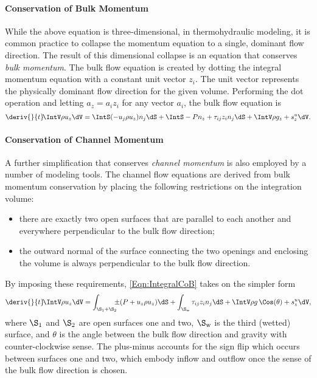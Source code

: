 \paragraph{Conservation of Bulk Momentum}
While the above equation is three-dimensional, in thermohydraulic modeling, it is common practice to collapse the momentum equation to a single, dominant flow direction.
The result of this dimensional collapse is an equation that conserves \textit{bulk momentum}.
The bulk flow equation is created by dotting the integral momentum equation with a constant unit vector $z_i$.
The unit vector represents the physically dominant flow direction for the given volume.
Performing the dot operation and letting $a_z = a_i z_i$ for any vector $a_i$, the bulk flow equation is 
\begin{equation}
    \deriv{}{t}\! \IntV \rho u_z \dV = \IntS (-u_j \rho u_z) n_j \dS + \IntS - P n_z + \tau_{ij} z_i n_j \dS + \IntV \rho g_z + s^u_z \dV.
    \label{Eqn:IntegralCoB}
\end{equation}

\paragraph{Conservation of Channel Momentum}
A further simplification that conserves \textit{channel momentum} is also employed by a number of modeling tools.
The channel flow equations are derived from bulk momentum conservation by placing the following restrictions on the integration volume:
\begin{itemize}
	\item{there are exactly two open surfaces that are parallel to each another and everywhere perpendicular to the bulk flow direction;}
	\item{the outward normal of the surface connecting the two openings and enclosing the volume is always perpendicular to the bulk flow direction.}
\end{itemize}
By imposing these requirements, \cref{Eqn:IntegralCoB} takes on the simpler form
\begin{equation}
    \deriv{}{t}\! \IntV \rho u_z \dV =
        \int_{\S_{\text{1}} + \S_{\text{2}}}\mkern-10mu \pm(P + u_z \rho u_z)\dS + 
        \int_{\S_{\text{w}}} \tau_{ij} z_i n_j \dS + \IntV \rho g\,\Cos(\theta) + s^u_z \dV,
    \label{Eqn:IntegralCoCF}
\end{equation}
where $\S_{\text{1}}$ and $\S_{\text{2}}$ are open surfaces one and two, $\S_{\text{w}}$ is the third (wetted) surface, and $\theta$ is the angle between the bulk flow direction and gravity with counter-clockwise sense.
The plus-minus accounts for the sign flip which occurs between surfaces one and two, which embody inflow and outflow once the sense of the bulk flow direction is chosen.





